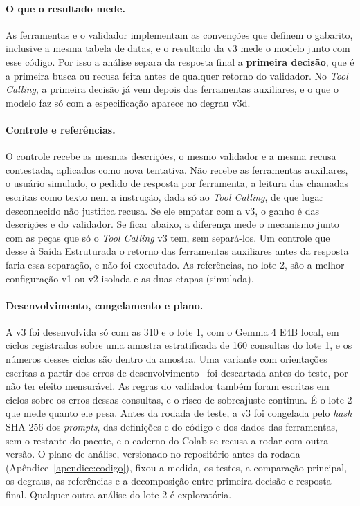 \paragraph{O que o resultado mede.} As ferramentas e o validador implementam as convenções que definem o gabarito, inclusive a mesma tabela de datas, e o resultado da v3 mede o modelo junto com esse código. Por isso a análise separa da resposta final a \textbf{primeira decisão}, que é a primeira busca ou recusa feita antes de qualquer retorno do validador. No \textit{Tool Calling}, a primeira decisão já vem depois das ferramentas auxiliares, e o que o modelo faz só com a especificação aparece no degrau v3d.

\paragraph{Controle e referências.} O controle recebe as mesmas descrições, o mesmo validador e a mesma recusa contestada, aplicados como nova tentativa. Não recebe as ferramentas auxiliares, o usuário simulado, o pedido de resposta por ferramenta, a leitura das chamadas escritas como texto nem a instrução, dada só ao \textit{Tool Calling}, de que lugar desconhecido não justifica recusa. Se ele empatar com a v3, o ganho é das descrições e do validador. Se ficar abaixo, a diferença mede o mecanismo junto com as peças que só o \textit{Tool Calling} v3 tem, sem separá-los. Um controle que desse à Saída Estruturada o retorno das ferramentas auxiliares antes da resposta faria essa separação, e não foi executado. As referências, no lote 2, são a melhor configuração v1 ou v2 isolada e as duas etapas (simulada).

\paragraph{Desenvolvimento, congelamento e plano.} A v3 foi desenvolvida só com as 310 e o lote 1, com o Gemma 4 E4B local, em ciclos registrados sobre uma amostra estratificada de 160 consultas do lote 1, e os números desses ciclos são dentro da amostra. Uma variante com orientações escritas a partir dos erros de desenvolvimento~\cite{zhao2024expel} foi descartada antes do teste, por não ter efeito mensurável. As regras do validador também foram escritas em ciclos sobre os erros dessas consultas, e o risco de sobreajuste continua. É o lote 2 que mede quanto ele pesa. Antes da rodada de teste, a v3 foi congelada pelo \textit{hash} SHA-256 dos \textit{prompts}, das definições e do código e dos dados das ferramentas, sem o restante do pacote, e o caderno do Colab se recusa a rodar com outra versão. O plano de análise, versionado no repositório antes da rodada (Apêndice~\ref{apendice:codigo}), fixou a medida, os testes, a comparação principal, os degraus, as referências e a decomposição entre primeira decisão e resposta final. Qualquer outra análise do lote 2 é exploratória.

